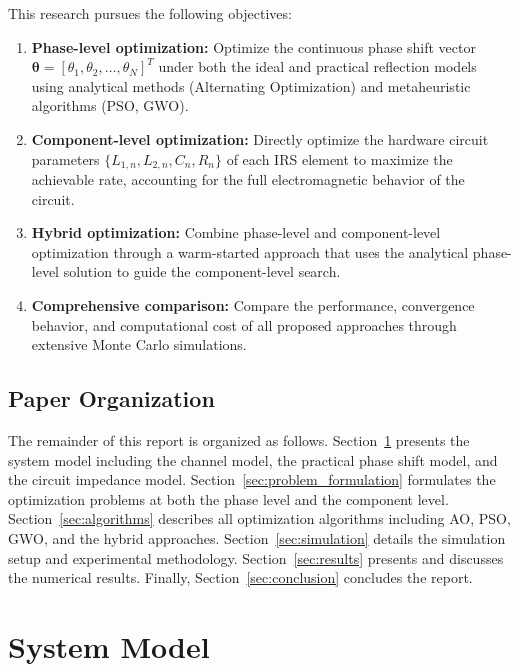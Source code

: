 \documentclass[12pt,a4paper]{article}
\newcommand{\vect}[1]{\boldsymbol{#1}}
\begin{document}
This research pursues the following objectives:
\begin{enumerate}[label=(\roman*)]
    \item \textbf{Phase-level optimization:} Optimize the continuous phase shift vector $\vect{\theta} = [\theta_1, \theta_2, \ldots, \theta_N]^T$ under both the ideal and practical reflection models using analytical methods (Alternating Optimization) and metaheuristic algorithms (PSO, GWO).

    \item \textbf{Component-level optimization:} Directly optimize the hardware circuit parameters $\{L_{1,n}, L_{2,n}, C_n, R_n\}$ of each IRS element to maximize the achievable rate, accounting for the full electromagnetic behavior of the circuit.

    \item \textbf{Hybrid optimization:} Combine phase-level and component-level optimization through a warm-started approach that uses the analytical phase-level solution to guide the component-level search.

    \item \textbf{Comprehensive comparison:} Compare the performance, convergence behavior, and computational cost of all proposed approaches through extensive Monte Carlo simulations.
\end{enumerate}

\subsection{Paper Organization}

The remainder of this report is organized as follows. Section~\ref{sec:system_model} presents the system model including the channel model, the practical phase shift model, and the circuit impedance model. Section~\ref{sec:problem_formulation} formulates the optimization problems at both the phase level and the component level. Section~\ref{sec:algorithms} describes all optimization algorithms including AO, PSO, GWO, and the hybrid approaches. Section~\ref{sec:simulation} details the simulation setup and experimental methodology. Section~\ref{sec:results} presents and discusses the numerical results. Finally, Section~\ref{sec:conclusion} concludes the report.


\section{System Model}
\label{sec:system_model}
\end{document}
